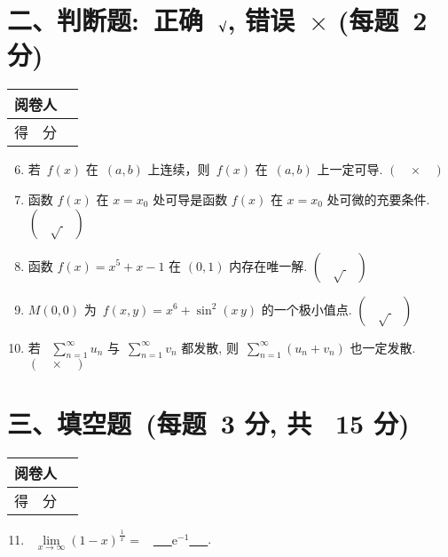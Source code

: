 \documentclass[twocolumn,landscape,UTF8]{ctexart}
\newcommand{\me}{\mathrm{e}}  %
\begin{document}
\begin{spacing}{1.3}
\section*{\hspace{4.5cm} 二、判断题:~正确~$\surd$, 错误~$\times$ (每题~2 分)}
\vspace{-1cm}
\begin{tabular}{|p{}|p{}|}
\hline
\centering 阅卷人& \\
\hline
\centering 得~~分 &  \\
	\hline
\end{tabular}
\begin{enumerate}\setcounter{enumi}{5}
			
\item 若~$f(x)$ 在~$(a,b)$ 上连续，则~$f(x)$ 在~$(a,b)$ 上一定可导. \hfill$(~~~~\times~~~~)$
\item 函数 $f(x)$ 在 $x=x_0$ 处可导是函数 $f(x)$ 在 $x=x_0$ 处可微的充要条件. \hfill $(~~~~\surd~~~~)$
\item 函数 $f(x)=x^5+x-1$ 在 $(0,1)$ 内存在唯一解. \hfill $(~~~~\surd~~~~)$
\item $M(0,0)$ 为~$f(x,y) = x^6 + \sin^2(x\,y)$ 的一个极小值点. \hfill $(~~~~\surd~~~~)$
\item 若 ~$\sum\limits_{n=1}^\infty u_n$ 与~$\sum\limits_{n=1}^\infty v_n$ 都发散, 则~$\sum\limits_{n=1}^\infty (u_n+v_n)$ 也一定发散. \hfill$(~~~~\times~~~~)$			
\end{enumerate}

\vspace{2cm}
\section*{\hspace{5cm} 三、填空题~(每题~3 分, 共~ 15 分)}
\vspace{-1cm}

\begin{tabular}{|p{}|p{}|}
			\hline
			\centering 阅卷人& \\
			\hline
			\centering 得~~分 &  \\
			\hline
		\end{tabular}
		\begin{enumerate}\setcounter{enumi}{10}
			\item ~$\lim\limits_{x\rightarrow \infty}(1-x)^{\frac{\,1\,}{x}}=$ ~\underline{~~~$\me^{-1}$~~~}.
			

\end{enumerate}
\end{spacing}
\end{document}

